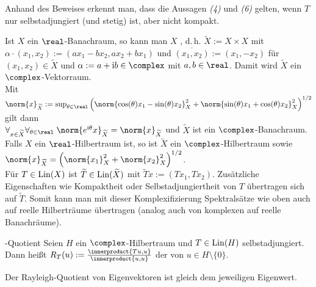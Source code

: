 \begin{Bem}
    Anhand des Beweises erkennt man, dass die Aussagen \emph{(4)} und \emph{(6)} gelten,
    wenn $T$ nur selbstadjungiert (und stetig) ist, aber nicht kompakt.
\end{Bem}

\linie

\begin{Bem}
    Ist $X$ ein $\real$-Banachraum, so kann man $X$ ,
    d.\,h. $\widetilde{X} := X \times X$ mit
    $\alpha \cdot (x_1, x_2) := (a x_1 - b x_2, a x_2 + b x_1)$ und
    $\overline{(x_1, x_2)} := (x_1, -x_2)$ für $(x_1, x_2) \in \widetilde{X}$ und
    $\alpha := a + \iu b \in \complex$ mit $a, b \in \real$.
    Damit wird $\widetilde{X}$ ein $\complex$-Vektorraum.\\
    Mit $\norm{x}_{\widetilde{X}} := \sup_{\theta \in \real}
    \left(\norm{\cos(\theta)x_1 - \sin(\theta)x_2}_X^2 +
    \norm{\sin(\theta)x_1 + \cos(\theta)x_2}_X^2\right)^{1/2}$ gilt dann\\
    $\forall_{x \in \widetilde{X}} \forall_{\theta \in \real}\;
    \norm{e^{\iu\theta}x}_{\widetilde{X}} = \norm{x}_{\widetilde{X}}$
    und $\widetilde{X}$ ist ein $\complex$-Banachraum.\\
    Falls $X$ ein $\real$-Hilbertraum ist, so ist $\widetilde{X}$ ein $\complex$-Hilbertraum
    sowie $\norm{x}_{\widetilde{X}} = \left(\norm{x_1}_X^2 + \norm{x_2}_X^2\right)^{1/2}$.\\
    Für $T \in \operatorname{Lin}(X)$ ist $\widetilde{T} \in \operatorname{Lin}(\widetilde{X})$ mit
    $\widetilde{T}x := (Tx_1, Tx_2)$.
    Zusätzliche Eigenschaften wie Kompaktheit oder Selbstadjungiertheit von $T$ übertragen sich
    auf $\widetilde{T}$.
    Somit kann man mit dieser Komplexifizierung Spektralsätze wie oben auch auf reelle
    Hilberträume übertragen (analog auch von komplexen auf reelle Banachräume).
\end{Bem}

\linie
\pagebreak

\begin{Def}{-Quotient}
    Seien $H$ ein $\complex$-Hilbertraum und $T \in \operatorname{Lin}(H)$ selbstadjungiert.\\
    Dann heißt $R_T(u) := \frac{\innerproduct{Tu, u}}{\innerproduct{u, u}}$
    der  von $u \in H \setminus \{0\}$.
\end{Def}

\begin{Bem}
    Der Rayleigh-Quotient von Eigenvektoren ist
    gleich dem jeweiligen Eigenwert.
\end{Bem}

